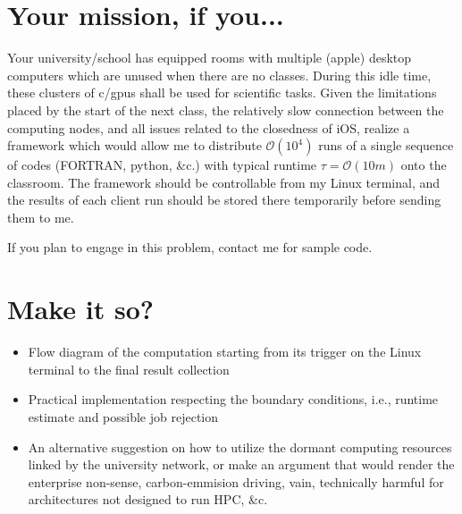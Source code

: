 \newcommand{\vect}[1]{\boldsymbol{#1}}

\begin{abstract}
At a dinner table, I once claimed that with refined 3D printers, interconnected cell phones, and now a Star-Trek-"Computer"
incarnation, the replicator age is close, i.e., the things consumable and desirable by individuals and which do not exceed a
certain size, can be produced in any country, city, village. We are only limited by not combining those things which surround
us even in so-called poor countries.

This project is poor Johannes' version of this very special blind man deriving pleasure from turning some numbers into others
by orchestrating an army of computers (not in the Butlerian Jihadi's sense). And envious he looks abroad without seeing all
the computational wealth surrounding him. Make him see and walk.
\end{abstract}

\section*{\bfseries{Your mission, if you...}}
Your university/school has equipped rooms with multiple (apple) desktop computers which are unused when there are
no classes. During this idle time, these clusters of c/gpus shall be used for scientific tasks. Given the
limitations placed by the start of the next class, the relatively slow connection between the computing nodes,
and all issues related to the closedness of iOS, realize a framework which would allow me to distribute $\mathcal{O}(10^4)$ runs of
a single sequence of codes (FORTRAN, python, &c.) with typical runtime $\tau=\mathcal{O}(10m)$ onto the classroom.
The framework should be controllable from my Linux terminal, and the results of each client run should be stored there temporarily
before sending them to me.

If you plan to engage in this problem, contact me for sample code.

\section*{\bfseries{Make it so?}}
\begin{itemize}
  \item Flow diagram of the computation starting from its trigger on the Linux terminal to the final result collection
  \item Practical implementation respecting the boundary conditions, i.e., runtime estimate and possible job rejection
  \item An alternative suggestion on how to utilize the dormant computing resources linked by the university network, or
make an argument that would render the enterprise non-sense, carbon-emmision driving, vain, technically harmful for architectures
not designed to run HPC, \&c.
\end{itemize}
